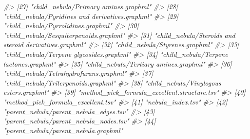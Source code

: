 \documentclass[]{tufte-handout}
\newenvironment{Shaded}{}{}
\newcommand{\CommentTok}[1]{\textcolor[rgb]{0.38,0.63,0.69}{\textit{#1}}}
\begin{document}
\begin{Shaded}
\begin{Highlighting}[]
\CommentTok{\#\textgreater{} [27] "child\_nebula/Primary amines.graphml"                  }
\CommentTok{\#\textgreater{} [28] "child\_nebula/Pyridines and derivatives.graphml"       }
\CommentTok{\#\textgreater{} [29] "child\_nebula/Pyrrolidines.graphml"                    }
\CommentTok{\#\textgreater{} [30] "child\_nebula/Sesquiterpenoids.graphml"                }
\CommentTok{\#\textgreater{} [31] "child\_nebula/Steroids and steroid derivatives.graphml"}
\CommentTok{\#\textgreater{} [32] "child\_nebula/Styrenes.graphml"                        }
\CommentTok{\#\textgreater{} [33] "child\_nebula/Terpene glycosides.graphml"              }
\CommentTok{\#\textgreater{} [34] "child\_nebula/Terpene lactones.graphml"                }
\CommentTok{\#\textgreater{} [35] "child\_nebula/Tertiary amines.graphml"                 }
\CommentTok{\#\textgreater{} [36] "child\_nebula/Tetrahydrofurans.graphml"                }
\CommentTok{\#\textgreater{} [37] "child\_nebula/Triterpenoids.graphml"                   }
\CommentTok{\#\textgreater{} [38] "child\_nebula/Vinylogous esters.graphml"               }
\CommentTok{\#\textgreater{} [39] "method\_pick\_formula\_excellent.structure.tsv"          }
\CommentTok{\#\textgreater{} [40] "method\_pick\_formula\_excellent.tsv"                    }
\CommentTok{\#\textgreater{} [41] "nebula\_index.tsv"                                     }
\CommentTok{\#\textgreater{} [42] "parent\_nebula/parent\_nebula\_edges.tsv"                }
\CommentTok{\#\textgreater{} [43] "parent\_nebula/parent\_nebula\_nodes.tsv"                }
\CommentTok{\#\textgreater{} [44] "parent\_nebula/parent\_nebula.graphml"}
\end{Highlighting}
\end{Shaded}
\end{document}
